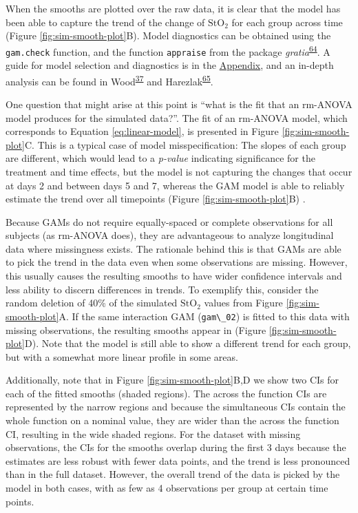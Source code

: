 \documentclass[
]{article}
\newcommand{\passthrough}[1]{#1}
\begin{document}
When the smooths are plotted over the raw data, it is clear that the model has been able to capture the trend of the change of \(\mbox{StO}_2\) for each group across time (Figure \ref{fig:sim-smooth-plot}B). Model diagnostics can be obtained using the \passthrough{\lstinline!gam.check!} function, and the function \passthrough{\lstinline!appraise!} from the package \emph{gratia}\textsuperscript{\protect\hyperlink{ref-gratia}{64}}. A guide for model selection and diagnostics is in the \protect\hyperlink{workflow}{Appendix}, and an in-depth analysis can be found in Wood\textsuperscript{\protect\hyperlink{ref-wood2017}{37}} and Harezlak\textsuperscript{\protect\hyperlink{ref-harezlak2018}{65}}.

One question that might arise at this point is ``what is the fit that an rm-ANOVA model produces for the simulated data?''. The fit of an rm-ANOVA model, which corresponds to Equation \eqref{eq:linear-model}, is presented in Figure \ref{fig:sim-smooth-plot}C. This is a typical case of model misspecification: The slopes of each group are different, which would lead to a \emph{p-value} indicating significance for the treatment and time effects, but the model is not capturing the changes that occur at days 2 and between days 5 and 7, whereas the GAM model is able to reliably estimate the trend over all timepoints (Figure \ref{fig:sim-smooth-plot}B) .

Because GAMs do not require equally-spaced or complete observations for all subjects (as rm-ANOVA does), they are advantageous to analyze longitudinal data where missingness exists. The rationale behind this is that GAMs are able to pick the trend in the data even when some observations are missing. However, this usually causes the resulting smooths to have wider confidence intervals and less ability to discern differences in trends. To exemplify this, consider the random deletion of 40\% of the simulated \(\mbox{StO}_2\) values from Figure \ref{fig:sim-smooth-plot}A. If the same interaction GAM (\passthrough{\lstinline!gam\_02!}) is fitted to this data with missing observations, the resulting smooths appear in (Figure \ref{fig:sim-smooth-plot}D). Note that the model is still able to show a different trend for each group, but with a somewhat more linear profile in some areas.

Additionally, note that in Figure \ref{fig:sim-smooth-plot}B,D we show two CIs for each of the fitted smooths (shaded regions). The across the function CIs are represented by the narrow regions and because the simultaneous CIs contain the whole function on a nominal value, they are wider than the across the function CI, resulting in the wide shaded regions. For the dataset with missing observations, the CIs for the smooths overlap during the first 3 days because the estimates are less robust with fewer data points, and the trend is less pronounced than in the full dataset. However, the overall trend of the data is picked by the model in both cases, with as few as 4 observations per group at certain time points.
\end{document}
